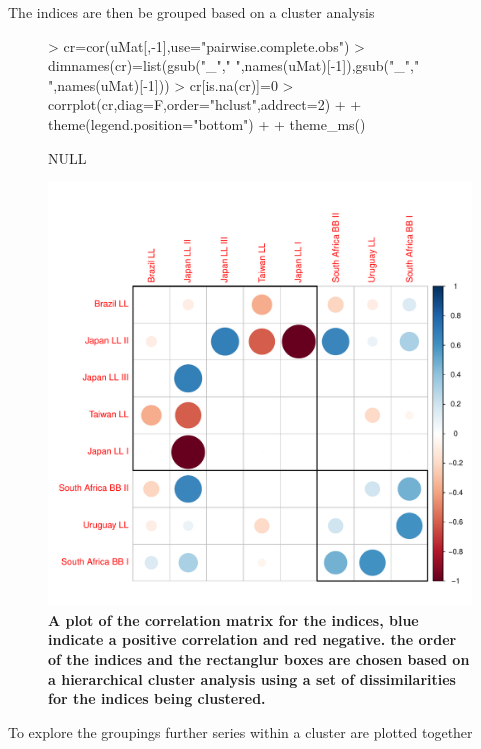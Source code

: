 \documentclass[shortnames,nojss,article]{jss}
\begin{document}
The indices are then be grouped based on a cluster analysis

\begin{figure}\begin{center}
\begin{Schunk}
\begin{Sinput}
> cr=cor(uMat[,-1],use="pairwise.complete.obs")
> dimnames(cr)=list(gsub("_"," ",names(uMat)[-1]),gsub("_"," ",names(uMat)[-1]))
> cr[is.na(cr)]=0
> corrplot(cr,diag=F,order="hclust",addrect=2)  +          
+              theme(legend.position="bottom")  +
+              theme_ms()
\end{Sinput}
\begin{Soutput}
NULL
\end{Soutput}
\end{Schunk}
\includegraphics{diags-015}
\caption{\bf{A plot of the correlation matrix for the indices, blue indicate a positive correlation 
and red negative. the order of the indices and the rectanglur boxes are chosen based on a hierarchical 
cluster analysis using a set of dissimilarities for the indices being clustered.}}
\label{cpue:3}
\end{center}
\end{figure}

To explore the groupings further series within a cluster are plotted together
\end{document}
